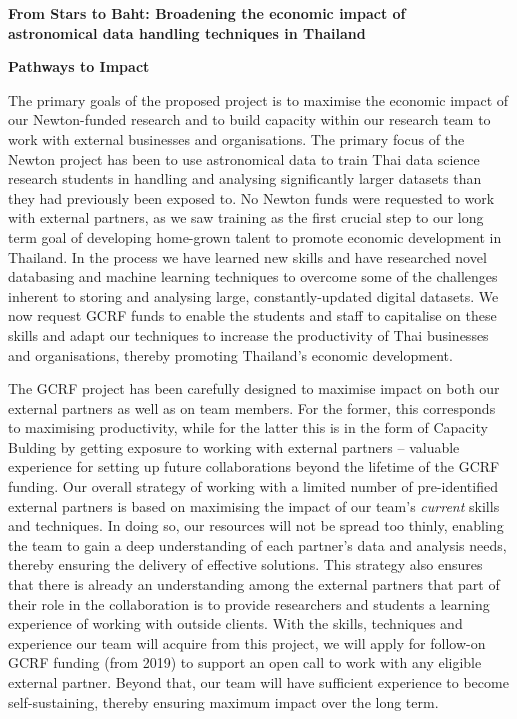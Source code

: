 \documentclass[11pt]{article}
\begin{document}
  \setcounter{figure}{0}
  \noindent
  {\LARGE \bf From Stars to Baht: Broadening the economic impact of \\
  astronomical data handling techniques in Thailand}
  
  \vspace{3mm}
  \noindent
  {\LARGE \bf Pathways to Impact}
  
  \vspace{3mm}
  \noindent
  The primary goals of the proposed project is to maximise the economic impact of our Newton-funded research and to build capacity within our research team to work with external businesses and organisations. The primary focus of the Newton project has been to use astronomical data to train Thai data science research students in handling and analysing significantly larger datasets than they had previously been exposed to. No Newton funds were requested to work with external partners, as we saw training as the first crucial step to our long term goal of developing home-grown talent to promote economic development in Thailand. In the process we have learned new skills and have researched novel databasing and machine learning techniques to overcome some of the challenges inherent to storing and analysing large, constantly-updated digital datasets. We now request GCRF funds to enable the students and staff to capitalise on these skills and adapt our techniques to increase the productivity of Thai businesses and organisations, thereby promoting Thailand's economic development.  
  
  \vspace{2mm}
  \noindent
  The GCRF project has been carefully designed to maximise impact on both our external partners as well as on team members. For the former, this corresponds to maximising productivity, while for the latter this is in the form of Capacity Bulding by getting exposure to working with external partners -- valuable experience for setting up future collaborations beyond the lifetime of the GCRF funding. Our overall strategy of working with a limited number of pre-identified external partners is based on maximising the impact of our team's {\it current} skills and techniques. In doing so, our resources will not be spread too thinly, enabling the team to gain a deep understanding of each partner's data and analysis needs, thereby ensuring the delivery of effective solutions. This strategy also ensures that there is already an understanding among the external partners that part of their role in the collaboration is to provide researchers and students a learning experience of working with outside clients. With the skills, techniques and experience our team will acquire from this project, we will apply for follow-on GCRF funding (from 2019) to support an open call to work with any eligible external partner. Beyond that, our team will have sufficient experience to become self-sustaining, thereby ensuring maximum impact over the long term.
  
\end{document}
